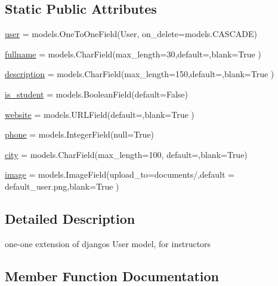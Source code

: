 \subsection*{Static Public Attributes}
\begin{DoxyCompactItemize}
\item 
\hyperlink{classmodels_1_1_instructor_aed24718cc72d6650dead072556e1d73b}{user} = models.\+One\+To\+One\+Field(User, on\+\_\+delete=models.\+C\+A\+S\+C\+A\+DE)
\item 
\hyperlink{classmodels_1_1_instructor_ad4d39e7d7fffd28664f69c2588e32ae9}{fullname} = models.\+Char\+Field(max\+\_\+length=30,default=\textquotesingle{}\textquotesingle{},blank=True )
\item 
\hyperlink{classmodels_1_1_instructor_abccce848362944335f1b25af2bc0f818}{description} = models.\+Char\+Field(max\+\_\+length=150,default=\textquotesingle{}\textquotesingle{},blank=True )
\item 
\hyperlink{classmodels_1_1_instructor_aa7ed2398a62decccb8795175fdbede0d}{is\+\_\+student} = models.\+Boolean\+Field(default=False)
\item 
\hyperlink{classmodels_1_1_instructor_abd5281a880321e409a4e0a490c87d4c2}{website} = models.\+U\+R\+L\+Field(default=\textquotesingle{}\textquotesingle{},blank=True )
\item 
\hyperlink{classmodels_1_1_instructor_a85ca94a7dc5ad5e80a822d9e83f5aec0}{phone} = models.\+Integer\+Field(null=\textquotesingle{}True\textquotesingle{})
\item 
\hyperlink{classmodels_1_1_instructor_ac0c4964afe9173812d1579c0ec63f229}{city} = models.\+Char\+Field(max\+\_\+length=100, default=\textquotesingle{}\textquotesingle{},blank=True)
\item 
\hyperlink{classmodels_1_1_instructor_ab6b343db0d24b97cb99f727597b52f94}{image} = models.\+Image\+Field(upload\+\_\+to=\textquotesingle{}documents/\textquotesingle{},default = \textquotesingle{}default\+\_\+user.\+png\textquotesingle{},blank=True )
\end{DoxyCompactItemize}


\subsection{Detailed Description}
one-\/one extension of django\textquotesingle{}s User model, for instructors 

\subsection{Member Function Documentation}
